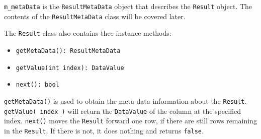 \documentclass[letterpaper, 12pt]{article}
\begin{document}
  \lstinline[basicstyle=\ttfamily]|m_metaData| is the 
  \lstinline[basicstyle=\ttfamily]|ResultMetaData| object that describes the 
  \lstinline[basicstyle=\ttfamily]|Result| object. The contents of the 
  \lstinline[basicstyle=\ttfamily]|ResultMetaData| class will be covered later.
  \par\vspace{\baselineskip}
  The \lstinline[basicstyle=\ttfamily]|Result| class also contains thee instance methods:
  \begin{itemize}
    \item \lstinline[basicstyle=\ttfamily]|getMetaData(): ResultMetaData|
    \item \lstinline[basicstyle=\ttfamily]|getValue(int index): DataValue|
    \item \lstinline[basicstyle=\ttfamily]|next(): bool|
  \end{itemize}
  \lstinline[basicstyle=\ttfamily]|getMetaData()| is used to obtain the meta-data 
  information about the \lstinline[basicstyle=\ttfamily]|Result|. 
  \lstinline[basicstyle=\ttfamily]|getValue( index )| will return the 
  \lstinline[basicstyle=\ttfamily]|DataValue| of the column at the specified index.
  \lstinline[basicstyle=\ttfamily]|next()| moves the 
  \lstinline[basicstyle=\ttfamily]|Result| forward one row, if there are still rows 
  remaining in the \lstinline[basicstyle=\ttfamily]|Result|. If there is not, it does 
  nothing and returns \lstinline[basicstyle=\ttfamily]|false|.
  
\end{document}
